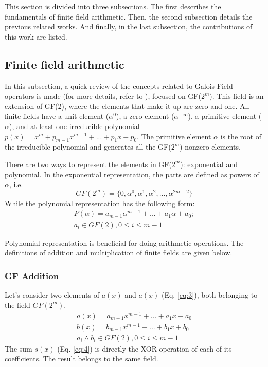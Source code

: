 This section is divided into three subsections. The first describes the fundamentals of finite field arithmetic. 
Then, the second subsection details the previous related works. And finally, in the last subsection, 
the contributions of this work are listed.

\subsection{Finite field arithmetic}

In this subsection, a quick review of the concepts related to Galois Field operators is made (for more details, refer to \cite{deschamps2009hardware}), 
focused on GF($2^m$). This field is an extension of GF(2), where the elements that make it up are zero and one. 
All finite fields have a unit element ($\alpha^0$), a zero element ($\alpha^{-\infty}$), a primitive element ($\alpha$), and at least one irreducible polynomial 
$p(x) = x^m + p_{m-1}x^{m-1} + ... + p_{1}x + p_{0}$. The primitive element $\alpha$ is the root of the irreducible polynomial and 
generates all the GF($2^m$) nonzero elements.


There are two ways to represent the elements in GF($2^m$): exponential and polynomial. 
In the exponential representation, the parts are defined as powers of $\alpha$, i.e.
\begin{equation}
 GF (2^m) = \{ 0, \alpha^0, \alpha^1, \alpha^2, ..., \alpha^{2m-2}  \}
 \label{eq:1}
\end{equation}
While the polynomial representation has the following form:
\begin{equation}
\begin{split}
 P(\alpha) = a_{m-1}\alpha^{m-1} + ... + a_{1}\alpha + a_{0};\\ 
 a_{i} \in GF(2), 0 \leq i \leq m-1
 \end{split}
 \label{eq:2}
\end{equation}


Polynomial representation is beneficial for doing arithmetic operations. %
The definitions of addition and multiplication of finite fields are given below.


\subsubsection{GF Addition}
Let's consider two elements of $a(x)$ and $a(x)$ (Eq. \ref{eq:3}), both belonging to the field $GF(2^m)$.
\begin{equation}
\begin{split}
 a(x) = a_{m-1}x^{m-1} + ... + a_{1}x + a_{0}\\
 b(x) = b_{m-1}x^{m-1} + ... + b_{1}x + b_{0}\\
 a_{i} \wedge b_{i} \in GF(2), 0 \leq i \leq m-1
 \end{split}
 \label{eq:3}
\end{equation}
The sum $s(x)$ (Eq. \ref{eq:4}) is directly the XOR operation of each of its coefficients. The result belongs to the same field.

